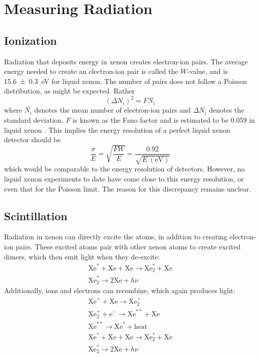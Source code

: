 \documentclass[herrin-thesis.tex]{subfiles}
\begin{document}
\section{Measuring Radiation}
\subsection{Ionization}
\label{sec:xe_ionization}
Radiation that deposits energy in xenon creates electron-ion pairs. The average energy needed to create an electron-ion pair is called the \(W\)-value, and is \SI{15.6\pm0.3}{\eV} \cite{Takahashi:1975kx} for liquid xenon. The number of pairs does not follow a Poisson distribution, as might be expected. Rather
\begin{equation}
\left (\Delta N_i \right)^2 = F \bar{N_i}
\end{equation}
where \(\bar{N_i}\) denotes the mean number of electron-ion pairs and \(\Delta N_i\) denotes the standard deviation. \(F\) is known as the Fano factor \cite{Fano:1947ys} and is estimated to be 0.059 in liquid xenon \cite{Doke:1976vn}. This implies the energy resolution of a perfect liquid xenon detector should be
\begin{equation}
\frac{\sigma}{E} = \sqrt{\frac{F W}{E}} = \frac{0.92}{\sqrt{E~(\text{eV})}}
\end{equation}
which would be comparable to the energy resolution of  detectors. However, no liquid xenon experiments to date have come close to this energy resolution, or even that for the Poisson limit. The reason for this discrepancy remains unclear.

\subsection{Scintillation}
Radiation in xenon can directly excite the atoms, in addition to creating electron-ion pairs. These excited atoms  pair with other xenon atoms to create excited dimers, which then emit light when they de-excite:
\begin{equation}
\begin{split}
\text{Xe}^{*} + \text{Xe} + \text{Xe} \rightarrow \text{Xe}^{*}_2 + \text{Xe} \\
\text{Xe}^{*}_2 \rightarrow 2\text{Xe} + h\nu
\end{split}
\end{equation}
Additionally, ions and electrons can recombine, which again produces light:
\begin{equation}
\begin{split}
\text{Xe}^{+} + \text{Xe} \rightarrow \text{Xe}^{+}_2 \\
\text{Xe}^{+}_2 + \text{e}^{-} \rightarrow \text{Xe}^{**} + \text{Xe} \\
\text{Xe}^{**} \rightarrow \text{Xe}^{*} + \text{heat} \\
\text{Xe}^{*} + \text{Xe} + \text{Xe} \rightarrow \text{Xe}^{*}_2 + \text{Xe} \\
\text{Xe}^{*}_2 \rightarrow 2\text{Xe} + h\nu
\end{split}
\end{equation}
\end{document}
